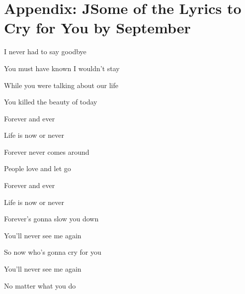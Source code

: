 \documentclass[10pt,a4paper]{article}
\begin{document}
	\section{Appendix: JSome of the Lyrics to Cry for You by September}
\begin{center}
	I never had to say goodbye

	You must have known I wouldn't stay

	While you were talking about our life

	You killed the beauty of today


	

	Forever and ever

	Life is now or never

	Forever never comes around

	People love and let go


	

	Forever and ever

	Life is now or never

	Forever's gonna slow you down


	

	You'll never see me again

	So now who's gonna cry for you

	You'll never see me again

	No matter what you do
	
\end{center}
\end{document}
